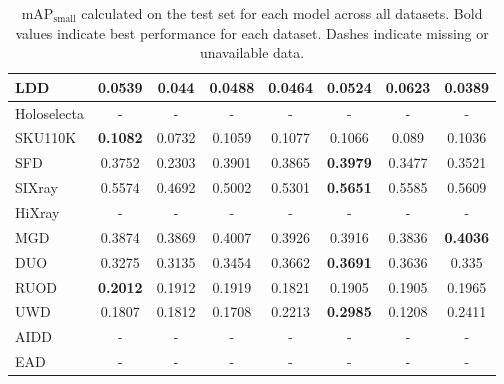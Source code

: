 \documentclass[runningheads]{llncs}
\begin{document}
\begin{table}[htbp]
\begin{tabular}{lccccccc}
LDD & 0.0539 & 0.044 & 0.0488 & 0.0464 & 0.0524 & \textbf{0.0623} & 0.0389 \\
\hline
Holoselecta & - & - & - & - & - & - & - \\
SKU110K & \textbf{0.1082} & 0.0732 & 0.1059 & 0.1077 & 0.1066 & 0.089 & 0.1036 \\
SFD & 0.3752 & 0.2303 & 0.3901 & 0.3865 & \textbf{0.3979} & 0.3477 & 0.3521 \\
\hline
SIXray & 0.5574 & 0.4692 & 0.5002 & 0.5301 & \textbf{0.5651} & 0.5585 & 0.5609 \\
HiXray & - & - & - & - & - & - & - \\
MGD & 0.3874 & 0.3869 & 0.4007 & 0.3926 & 0.3916 & 0.3836 & \textbf{0.4036} \\
\hline
DUO & 0.3275 & 0.3135 & 0.3454 & 0.3662 & \textbf{0.3691} & 0.3636 & 0.335 \\
RUOD & \textbf{0.2012} & 0.1912 & 0.1919 & 0.1821 & 0.1905 & 0.1905 & 0.1965 \\
UWD & 0.1807 & 0.1812 & 0.1708 & 0.2213 & \textbf{0.2985} & 0.1208 & 0.2411 \\
\hline
AIDD & - & - & - & - & - & - & - \\
EAD & - & - & - & - & - & - & - \\
\hline
\end{tabular}
\caption{mAP$_{\text{small}}$ calculated on the test set for each model across all datasets. Bold values indicate best performance for each dataset. Dashes indicate missing or unavailable data.}
\label{tab:yolo_mapsmall_comparison}
\end{table}
\end{document}
